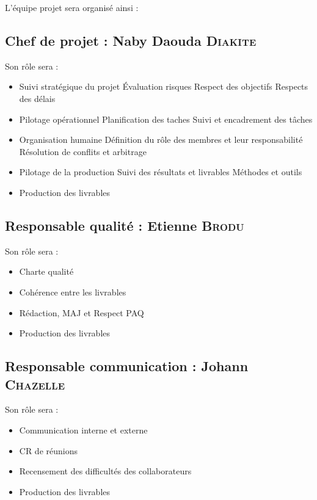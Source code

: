 L’équipe projet sera organisé ainsi :
\subsection{Chef de projet : Naby Daouda \textsc{Diakite}}

Son rôle sera :
\begin{itemize}
    \item Suivi stratégique du projet
        \subitem Évaluation risques
        \subitem Respect des objectifs
        \subitem Respects des délais
    \item Pilotage opérationnel
        \subitem Planification des taches
        \subitem Suivi et encadrement des tâches
    \item Organisation humaine
        \subitem Définition du rôle des membres et leur responsabilité
        \subitem Résolution de conflits et arbitrage
    \item Pilotage de la production
        \subitem Suivi des résultats et livrables
        \subitem Méthodes et outils
    \item Production des livrables
\end{itemize}

\subsection{Responsable qualité : Etienne \textsc{Brodu}}

Son rôle sera :
\begin{itemize}
    \item Charte qualité
    \item Cohérence entre les livrables
    \item Rédaction, MAJ  et Respect PAQ
    \item Production des livrables
\end{itemize}

\subsection{Responsable communication : Johann \textsc{Chazelle}}

Son rôle sera :
\begin{itemize}
    \item Communication interne et externe
    \item CR de réunions
    \item Recensement des difficultés des collaborateurs
    \item Production des livrables
\end{itemize}

